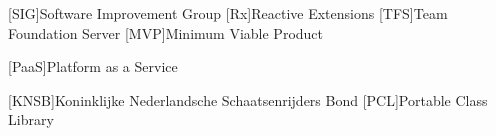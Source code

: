 [SIG]{Software Improvement Group}
[Rx]{Reactive Extensions}
[TFS]{Team Foundation Server}
[MVP]{Minimum Viable Product}

[PaaS]{Platform as a Service}

[KNSB]{Koninklijke Nederlandsche Schaatsenrijders Bond}
[PCL]{Portable Class Library}
